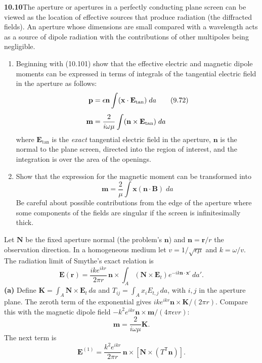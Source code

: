 \par\bigskip
\noindent\textbf{10.10}\quad The aperture or apertures in a perfectly conducting plane screen can be viewed as the location of effective sources that produce radiation (the diffracted fields). An aperture whose dimensions are small compared with a wavelength acts as a source of dipole radiation with the contributions of other multipoles being negligible.
\begin{enumerate}
\item[(a)] Beginning with (10.101) show that the effective electric and magnetic dipole moments can be expressed in terms of integrals of the tangential electric field in the aperture as follows:
\begin{align}
\mathbf{p}&=\epsilon\mathbf{n}\int(\mathbf{x}\cdot\mathbf{E}_{\mathrm{tan}})\;da\tag{9.72}\\[4pt]
\mathbf{m}&=\frac{2}{i\omega\mu}\int(\mathbf{n}\times\mathbf{E}_{\mathrm{tan}})\;da\notag
\end{align}
where $\mathbf{E}_{\mathrm{tan}}$ is the \emph{exact} tangential electric field in the aperture, $\mathbf{n}$ is the normal to the plane screen, directed into the region of interest, and the integration is over the area of the openings.
\item[(b)] Show that the expression for the magnetic moment can be transformed into
\[
\mathbf{m}=\frac{2}{\mu}\int\mathbf{x}(\mathbf{n}\cdot\mathbf{B})\;da\tag{9.74}
\]
Be careful about possible contributions from the edge of the aperture where some components of the fields are singular if the screen is infinitesimally thick.
\end{enumerate}
\solution
Let $\mathbf N$ be the fixed aperture normal (the problem's $\mathbf n$)
and $\mathbf n=\mathbf r/r$ the observation direction. In a homogeneous
medium let $v=1/\sqrt{\epsilon\mu}$ and $k=\omega/v$.
The radiation limit of Smythe's exact relation is
\[
\mathbf E(\mathbf r)=\frac{ik e^{ikr}}{2\pi r}\,
\mathbf n\times\int_A(\mathbf N\times\mathbf E_t)
e^{-ik\mathbf n\cdot\mathbf x'}\,da'.
\]
\textbf{(a)} Define $\mathbf K=\int_A\mathbf N\times\mathbf E_t\,da$
and $T_{ij}=\int_A x_iE_{t,j}\,da$, with $i,j$ in the aperture plane.
The zeroth term of the exponential gives
$ik e^{ikr}\mathbf n\times\mathbf K/(2\pi r)$.
Compare this with the magnetic dipole field
$-k^2e^{ikr}\mathbf n\times\mathbf m/(4\pi\epsilon v r)$:
\[
\boxed{\mathbf m=\frac{2}{i\omega\mu}\mathbf K.}
\]
The next term is
\[
\mathbf E^{(1)}=\frac{k^2e^{ikr}}{2\pi r}
\,\mathbf n\times\left[\mathbf N\times(T^{\mathsf T}\mathbf n)\right].
\]
